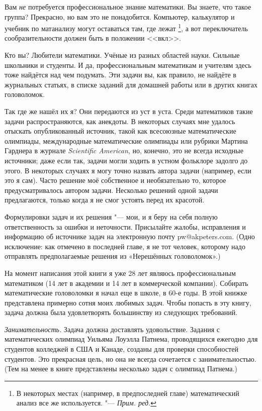 \documentclass[twoside]{book}
\begin{document}
Вам \emph{не} потребуется профессиональное знание математики.
Вы знаете, что такое группа? Прекрасно, но вам это не понадобится.
Компьютер, калькулятор и учебник по матанализу могут оставаться там, где лежат%
\footnote{В некоторых местах (например, в предпоследней главе) математический анализ все же используется. "--- \emph{Прим. ред.}}, а вот переключатель сообразительности должен быть в положении <<вкл>>.

Кто вы? Любители математики.
Учёные из разных областей науки.
Сильные школьники и студенты.
И да, профессиональным математикам и учителям здесь тоже найдётся над чем подумать.
Эти задачи вы, как правило, не найдёте в журнальных статьях, в списке заданий для домашней работы или в других книгах головоломок.

Так где же нашёл их я? Они передаются из уст в уста.
Среди математиков такие задачи распространяются, как анекдоты.
В некоторых случаях мне удалось отыскать опубликованный источник, такой как всесоюзные математические олимпиады, международные математические олимпиады или рубрики Мартина Гарднера в журнале \emph{Scientific American}, но, конечно, это не всегда исходные источники;
даже если так, задачи могли ходить в устном фольклоре задолго до этого.
В некоторых случаях я могу точно назвать автора задачи (например, если это я сам).
Часто решение моё собственное и необязательно то, которое предусматривалось автором задачи.
Несколько решений одной задачи предлагаются, только когда я не смог устоять перед их красотой.

Формулировки задач и их решения "--- мои, и я беру на себя полную ответственность за ошибки и неточности.
Присылайте жалобы, исправления и информацию об источнике задач на электронную почту pw@akpeters.com.
(Одно исключение: как отмечено в последней главе, я не тот человек, которому надо отправлять предполагаемые решения из «Нерешённых головоломок».)

На момент написания этой книги я уже 28 лет являюсь профессиональным математиком
(14 лет в академии и 14 лет в коммерческой компании).
Собирать математические головоломки я начал еще в школе, в 60-е годы.
В этой книжке представлена примерно сотня моих любимых задач.
Чтобы попасть в эту книгу, задача должна была удовлетворять большинству из следующих требований.

\textit{Занимательность.}
Задача должна доставлять удовольствие.
Задания с математических олимпиад Уильяма Лоуэлла Патнема, проводящихся ежегодно для студентов колледжей в США и Канаде, созданы для проверки способностей студентов.
Это прекрасная цель, но она не всегда сочетается с занимательностью.
(Тем на менее в книге представлены несколько задач с олимпиад Патнема.)
\end{document}
